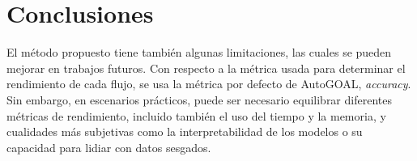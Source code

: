 \documentclass[a4paper,12pt]{article}
\begin{document}



\section{Conclusiones}\label{sec:conc}

El método propuesto tiene también algunas limitaciones, las cuales se pueden mejorar en trabajos futuros. Con respecto a la métrica usada para determinar el rendimiento de cada flujo, se usa la métrica por defecto de AutoGOAL, \textit{accuracy}. Sin embargo, en escenarios prácticos, puede ser necesario equilibrar diferentes métricas de rendimiento, incluido también el uso del tiempo y la memoria, y cualidades más subjetivas como la interpretabilidad de los modelos o su capacidad para lidiar con datos sesgados. %
\end{document}
